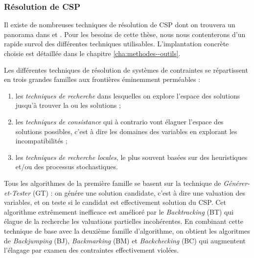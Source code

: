 \subsubsection{R\'esolution de CSP}
\label{sec:resolution-de-csp}

Il existe de nombreuses techniques de r\'esolution de CSP dont on
trouvera un panorama dans \cite{cp-survey99} et
\cite{csp-survey}. Pour les besoins de cette th\`ese, nous nous
contenterons d'un rapide survol des diff\'erentes techniques
utilisables. L'implantation concr\`ete choisie est d\'etaill\'ee
dans le chapitre \ref{cha:methodes--outils}.

Les diff\'erentes techniques de r\'esolution de syst\`emes de
contraintes se r\'epartissent en trois grandes familles aux
fronti\`eres \'eminemment perm\'eables :
\begin{enumerate}
  \item les \emph{techniques de recherche} dans lesquelles on explore
  l'espace des solutions jusqu'\`a trouver la ou les solutions ;
\item les \emph{techniques de consistance} qui \`a contrario vont \'elaguer
  l'espace des solutions possibles, c'est \`a dire les domaines des
  variables en explorant les incompatibilit\'es ;
\item les \emph{techniques de recherche locales}, le plus souvent
  bas\'ees sur des heuristiques et/ou des processus stochastiques.
\end{enumerate}

Tous les algorithmes de la premi\`ere famille se basent sur la
technique de \emph{G\'en\'erer-et-Tester} (GT) : on g\'en\'ere une
solution candidate, c'est \`a dire une valuation des variables, et on
teste si le candidat est effectivement solution du CSP. Cet algorithme
extr\^emement  inefficace est am\'elior\'e par le
\emph{Backtracking} (BT) qui \'elague de la recherche les valuations
partielles incoh\'erentes. En combinant cette technique de base avec
la deuxi\`eme famille d'algorithme, on obtient les algoritmes de
\emph{Backjumping} (BJ), \emph{Backmarking} (BM) et
\emph{Backchecking} (BC) qui augmentent l'\'elagage par examen des
contraintes effectivement viol\'ees.

